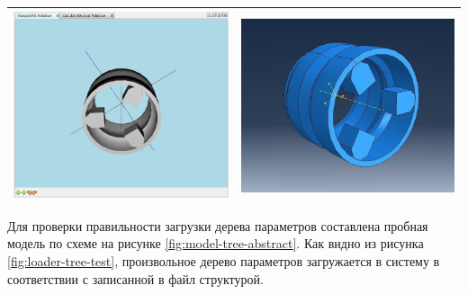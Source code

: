 \documentclass[14pt,oneside,final]{extreport}
\begin{document}
\begin{table}[]
{{\begin{tabu}[]{|c|c|}
				\includegraphics[scale=0.40]{img/loader-test3} & \includegraphics[scale=0.43]{img/loader-test3-abq} \\ 
				\hline
		\end{tabu}
		}
	}\end{table}
	
	Для проверки правильности загрузки дерева параметров составлена пробная модель по схеме на рисунке \ref{fig:model-tree-abstract}. Как видно из рисунка \ref{fig:loader-tree-test}, произвольное дерево параметров загружается в систему в соответствии с записанной в файл структурой.
	
\end{document}
